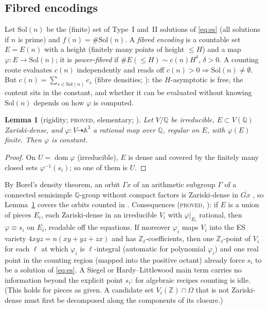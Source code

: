 \documentclass[10pt,reqno]{amsart}
\newtheorem{lemma}[theorem]{Lemma}
\theoremstyle{definition}
\numberwithin{equation}{section}
\newcommand{\Z}{\mathbb Z}
\newcommand{\Q}{\mathbb Q}
\newcommand{\status}[1]{\textup{\textsc{#1}}}
\begin{document}
\subsection{Fibred encodings}\label{ssec:fibred}
Let $\mathrm{Sol}(n)$ be the (finite) set of Type~I and~II solutions of
\eqref{eq:es} (all solutions if $n$ is prime) and $f(n)=\#\mathrm{Sol}(n)$. A \emph{fibred encoding} is
a countable set $E=E(n)$ with a height (finitely many points of height
$\le H$) and a map $\varphi:E\to\mathrm{Sol}(n)$; it is \emph{power-fibred} if
$\#E(\le H)\sim c(n)H^\delta$, $\delta>0$. A counting route evaluates $c(n)$
independently and reads off $c(n)>0\Rightarrow\mathrm{Sol}(n)\ne\emptyset$. But
$c(n)=\sum_{s\in\mathrm{Sol}(n)}c_s$ (fibre densities; \cite[Lemma~1.2]{LF}): the
$H$-asymptotic is free, the content sits in the constant, and whether it
can be evaluated without knowing $\mathrm{Sol}(n)$ depends on how $\varphi$
is computed.

\begin{lemma}[rigidity; \status{proved}, elementary; {\cite[Lemma~2.1]{LF}}]\label{lem:rigid}
Let $V/\Q$ be irreducible, $E\subset V(\Q)$ Zariski-dense, and
$\varphi:V\dashrightarrow\mathbb A^3$ a rational map over $\Q$, regular on $E$,
with $\varphi(E)$ finite. Then $\varphi$ is constant.
\end{lemma}
\begin{proof}
On $U=\operatorname{dom}\varphi$ (irreducible), $E$ is dense and covered by
the finitely many closed sets $\varphi^{-1}(s_i)$; so one of them is $U$.
\end{proof}
By Borel's density theorem, an orbit $\Gamma x$ of an arithmetic subgroup
$\Gamma$ of a connected semisimple $\Q$-group without compact factors is
Zariski-dense in $\overline{Gx}$ \cite[Lemma~2.2]{LF}, so
Lemma~\ref{lem:rigid} covers the orbits counted in \cite{DRS,EM}. Consequences
(\status{proved}, \cite[Thm.~2.3]{LF}): if $E$ is a union of pieces $E_i$,
each Zariski-dense in an irreducible $V_i$ with $\varphi|_{E_i}$ rational,
then $\varphi\equiv s_i$ on $E_i$, readable off the equations. If moreover
$\varphi_i$ maps $V_i$ into the ES variety $4xyz=n(xy+yz+zx)$ and has
$\Z_\ell$-coefficients, then one $\Z_\ell$-point of $V_i$ for each $\ell$ at which
$\varphi_i$ is $\ell$-integral (automatic for polynomial $\varphi_i$) and one real
point in the counting region (mapped into the positive octant) already
force $s_i$ to be a solution of \eqref{eq:es}. A
Siegel or Hardy--Littlewood main term carries no information beyond the
explicit point $s_i$: for algebraic recipes counting is idle. (This holds
for pieces as given. A candidate set $V_i(\Z)\cap\Omega$ that is not
Zariski-dense must first be decomposed along the components of its
closure.)
\end{document}
